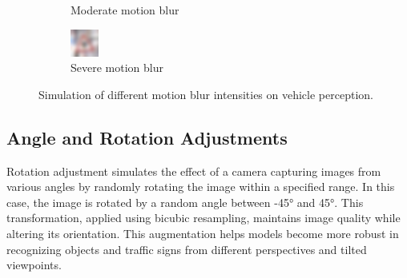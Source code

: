 \begin{figure}[H]
\begin{subfigure}{0.3\textwidth}
        \caption{Moderate motion blur}
        \label{fig:subfig5}
    \end{subfigure}
    \begin{subfigure}{0.26\textwidth}
        \includegraphics[width=\linewidth]{images/figure12/3.png}
        \caption{Severe motion blur}
        \label{fig:subfig6}
    \end{subfigure}
    \caption{Simulation of different motion blur intensities on vehicle perception.}
    \label{fig:fig12}
\end{figure}

\subsection{Angle and Rotation Adjustments}

Rotation adjustment simulates the effect of a camera capturing images from various angles by randomly rotating 
the image within a specified range. In this case, the image is rotated by a random angle between -45° and 45°. 
This transformation, applied using bicubic resampling, maintains image quality while altering its orientation. 
This augmentation helps models become more robust in recognizing objects and traffic signs from different 
perspectives and tilted viewpoints. 

